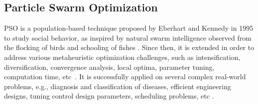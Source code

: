 \subsection{Particle Swarm Optimization}
PSO is a population-based technique proposed by Eberhart and Kennedy in 1995 to study social behavior, as inspired by natural swarm intelligence observed from the flocking of birds and schooling of fishes \cite{Kennedy1995ParticleOptimization}. Since then, it is extended in order to address various metaheuristic optimization challenges, such as intensification, diversification, convergence analysis, local optima, parameter tuning, computation time, etc~\cite{Sengupta2018ParticlePerspectives}. It is successfully applied on several complex real-world problems, e.g., diagnosis and classification of diseases, efficient engineering designs, tuning control design parameters, scheduling problems, etc \cite{Poli2008AnApplications}. 

